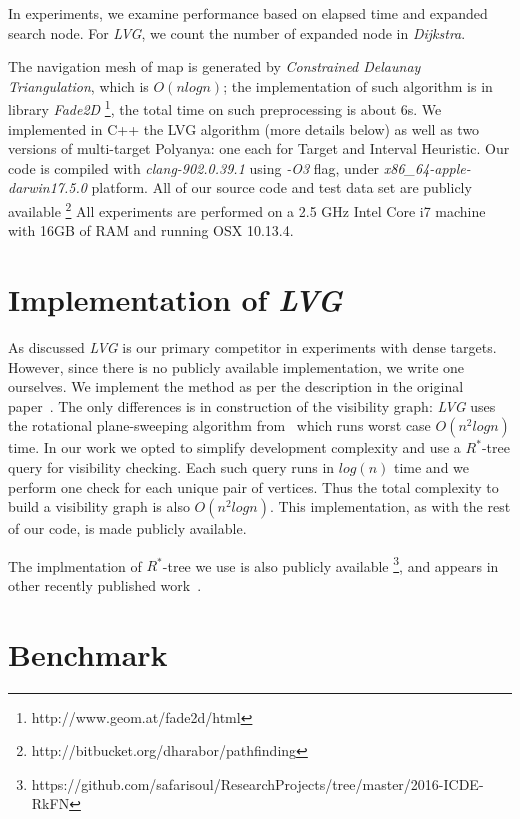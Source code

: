 In experiments, we examine performance based on elapsed time and expanded search node.
For \textit{LVG}, we count the number of expanded node in \textit{Dijkstra}.

The navigation mesh of map is generated by \textit{Constrained Delaunay Triangulation}, which is $O(nlogn)$;
the implementation of such algorithm is in library \textit{Fade2D} \footnote{http://www.geom.at/fade2d/html},
the total time on such preprocessing is about 6s.
We implemented in C++ the LVG algorithm (more details below) as well as two versions of multi-target Polyanya:
one each for Target and Interval Heuristic.
Our code is compiled with \textit{clang-902.0.39.1} using \textit{-O3} flag,
under \textit{x86\_64-apple-darwin17.5.0} platform.
All of our source code and test data set are  publicly available \footnote{http://bitbucket.org/dharabor/pathfinding}
All experiments are performed on a 2.5 GHz Intel Core i7 machine with 16GB of RAM and running OSX 10.13.4. 


\section{Implementation of \textit{LVG}}\label{imptlvg}
As discussed \textit{LVG} is our primary competitor in experiments with dense targets.
However, since there is no publicly available implementation, we write one ourselves.
We implement the method as per the description in the original paper~\cite{zhang2004spatial}.
The only differences is in construction of the visibility graph:
\textit{LVG} uses the rotational plane-sweeping algorithm from~\cite{sharir1986shortest} which runs worst case $O(n^2logn)$ time.
In our work we opted to simplify development complexity and use a $R^*$-tree\cite{beckmann1990r} query for visibility checking.
Each such query runs in $log(n)$ time  and we perform one check for each unique pair of vertices.
Thus the total complexity to build a visibility graph is also $O(n^2logn)$.
This implementation, as with the rest of our code, is made publicly available.

The implmentation of $R^*$-tree we use is also publicly available \footnote{https://github.com/safarisoul/ResearchProjects/tree/master/2016-ICDE-RkFN},
and appears in other recently published work~\cite{wang2016efficiently}.

\section{Benchmark}\label{dataset}

